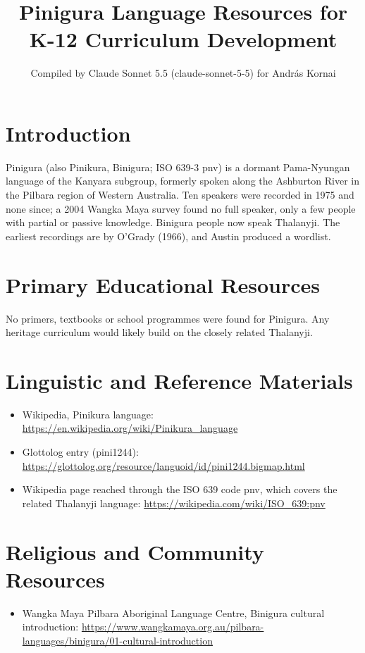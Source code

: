 \documentclass[12pt]{article}
\title{Pinigura Language Resources for K-12 Curriculum Development}
\author{Compiled by Claude Sonnet 5.5 (claude-sonnet-5-5) for Andr\'as Kornai}
\date{}
\begin{document}
\maketitle

\section{Introduction}
Pinigura (also Pinikura, Binigura; ISO 639-3 pnv) is a dormant Pama-Nyungan language of the Kanyara subgroup, formerly spoken along the Ashburton River in the Pilbara region of Western Australia. Ten speakers were recorded in 1975 and none since; a 2004 Wangka Maya survey found no full speaker, only a few people with partial or passive knowledge. Binigura people now speak Thalanyji. The earliest recordings are by O'Grady (1966), and Austin produced a wordlist.

\section{Primary Educational Resources}
No primers, textbooks or school programmes were found for Pinigura. Any heritage curriculum would likely build on the closely related Thalanyji.

\section{Linguistic and Reference Materials}
\begin{itemize}
\item Wikipedia, Pinikura language: \url{https://en.wikipedia.org/wiki/Pinikura_language}
\item Glottolog entry (pini1244): \url{https://glottolog.org/resource/languoid/id/pini1244.bigmap.html}
\item Wikipedia page reached through the ISO 639 code pnv, which covers the related Thalanyji language: \url{https://wikipedia.com/wiki/ISO_639:pnv}
\end{itemize}

\section{Religious and Community Resources}
\begin{itemize}
\item Wangka Maya Pilbara Aboriginal Language Centre, Binigura cultural introduction: \url{https://www.wangkamaya.org.au/pilbara-languages/binigura/01-cultural-introduction}
\end{itemize}
\end{document}
